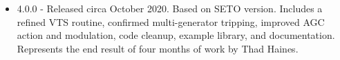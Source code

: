 \begin{minipage}{.666\linewidth}
\begin{itemize}

 em
\item 4.0.0 - Released circa October 2020. Based on SETO version. 
Includes a refined VTS routine, confirmed multi-generator tripping, improved AGC action and modulation, code cleanup, example library, and documentation.
Represents the end result of four months of work by Thad Haines.
\end{itemize}
\end{minipage}%
